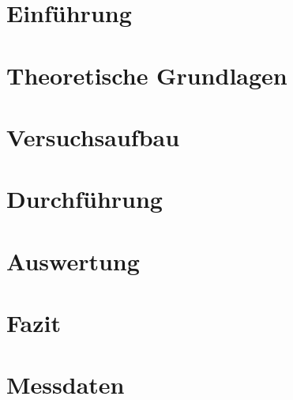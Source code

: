 \documentclass[
    abteilunga,         %
    english,ngerman     %
]{tudfp}                %
\begin{document}
\maketitle

\tableofcontents
\cleardoublepage


\section{Einführung}
%


\section{Theoretische Grundlagen}
%


\section{Versuchsaufbau}
%


\section{Durchführung}
%


\section{Auswertung}
%


\section{Fazit}
%




\section{Messdaten}
%


\end{document}
